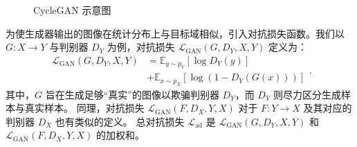\begin{figure}[!ht]
	\setlength{\subfigcapskip}{-1bp}
	\centering
	\begin{minipage}{\textwidth}
	  \centering
	  \hspace{0.1em}
	  \hspace{0.1em}
	\end{minipage}
	\caption{CycleGAN 示意图}
	\label{fig:cyclegan原理} %
  \end{figure}
  
为使生成器输出的图像在统计分布上与目标域相似，引入对抗损失函数。我们以$G: X \rightarrow Y$ 与判别器 $D_Y$ 为例，对抗损失 $\mathcal{L}_\mathrm{GAN}(G,D_Y,X,Y)$ 定义为：
\begin{equation}
    \label{eq1}
    \begin{aligned}
        \mathcal{L}_\mathrm{GAN}(G,D_Y,X,Y) &= \mathbb{E}_{y \sim p_Y}[\log D_Y(y)] \\
        &+ \mathbb{E}_{x \sim p_X}[\log (1-D_Y(G(x)))] 
    \end{aligned}.
\end{equation}
其中，$G$ 旨在生成足够“真实”的图像以欺骗判别器 $D_Y$，而 $D_Y$ 则尽力区分生成样本与真实样本。
同理，对抗损失 $\mathcal{L}_\mathrm{GAN}(F,D_X,Y,X)$ 对于 $F: Y \rightarrow X$ 及其对应的判别器 $D_X$ 也有类似的定义。
总对抗损失 $\mathcal{L}_{\mathrm{ad}}$ 是 $\mathcal{L}_\mathrm{GAN}(G,D_Y,X,Y)$ 和 $\mathcal{L}_\mathrm{GAN}(F,D_X,Y,X)$ 的加权和。

